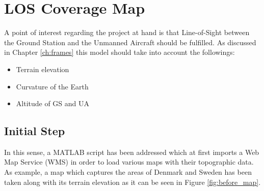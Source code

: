\section{LOS Coverage Map}\label{sec:los_map}
A point of interest regarding the project at hand is that Line-of-Sight between the Ground Station and the Unmanned Aircraft should be fulfilled. As discussed in Chapter \ref{ch:frames} this model should take into account the followings:

\begin{itemize}
	\item Terrain elevation
	\item Curvature of the Earth
	\item Altitude of GS and UA
\end{itemize}

\subsection{Initial Step}
In this sense, a MATLAB script has been addressed which at first imports a Web Map Service (WMS) in order to load various maps with their topographic data. As example, a map which captures the areas of Denmark and Sweden has been taken along with its terrain elevation as it can be seen in Figure \ref{fig:before_map}.

